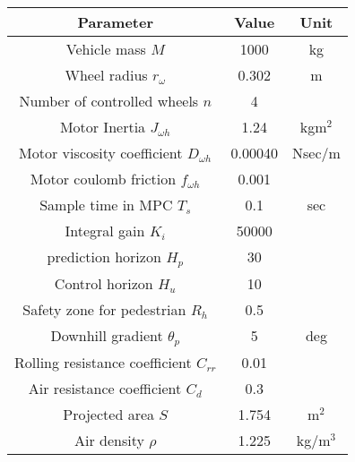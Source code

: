 \begin{tabular}{|c|c|c|}
        \hline
        Parameter                                  & Value   & Unit     \\ \hline
        Vehicle mass $M$                           & 1000    & kg       \\ \hline
        Wheel radius $r_{\omega}$                  & 0.302   & m        \\ \hline
        Number of controlled wheels $n$            & 4       &          \\ \hline
        Motor Inertia $J_{\omega h}$               & 1.24    & kgm$^2$  \\ \hline
        Motor viscosity coefficient $D_{\omega h}$ & 0.00040 & Nsec/m   \\ \hline
        Motor coulomb friction $f_{\omega h}$      & 0.001   &          \\ \hline
        Sample time in MPC $T_s$                   & 0.1     & sec      \\ \hline
        Integral gain $K_i$                        & 50000   &          \\ \hline
        prediction horizon $H_p$                   & 30      &          \\ \hline
        Control horizon $H_u$                      & 10      &          \\ \hline
        Safety zone for pedestrian $R_h$           & 0.5     &          \\ \hline
        Downhill gradient $\theta_p$               & 5       & deg      \\ \hline
        Rolling resistance coefficient $C_{rr}$    & 0.01    &          \\ \hline
        Air resistance coefficient $C_d$           & 0.3     &          \\ \hline
        Projected area $S$                         & 1.754   & m$^2$    \\ \hline
        Air density $\rho$                         & 1.225   & kg/m$^3$ \\ \hline
\end{tabular}